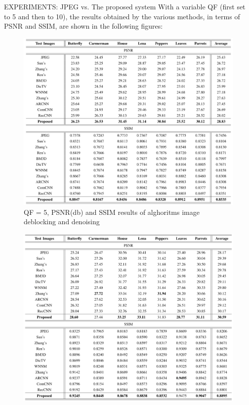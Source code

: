 \documentclass[10pt]{beamer}
\begin{document}
\begin{frame}{EXPERIMENTS: JPEG vs. The proposed system}
    With a variable QF (first set to 5 and then to 10), the results obtained by 
    the various methods, in terms of PSNR and SSIM, are shown in the following figures:
    \begin{minipage}{\linewidth}
        \centering
        \begin{minipage}{0.45\linewidth}
            \begin{figure}[H]
                \includegraphics[width = 1 \linewidth]{images/paper3/comparison.png}
                \caption{QF = 5, PSNR(db) and SSIM results of alghoritms image deblocking and denoising}
            \end{figure}
        \end{minipage}
        \hspace{0.05\linewidth}
        \begin{minipage}{0.45\linewidth}
            \begin{figure}[htbp]
                \centering
                \includegraphics[width = 1 \linewidth]{images/paper3/comparison2.png}

\end{figure}
\end{minipage}
\end{minipage}
\end{frame}
\end{document}
